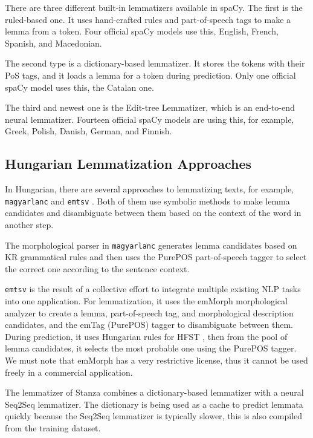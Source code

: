 \documentclass{llncs}
\newcommand{\emtsv}{\texttt{emtsv}}
\newcommand{\magyarlanc}{\texttt{magyarlanc}}
\begin{document}
There are three different built-in lemmatizers available in spaCy. The first is the ruled-based one. It uses hand-crafted rules and part-of-speech tags to make a lemma from a token. Four official spaCy models use this, English, French, Spanish, and Macedonian.

The second type is a dictionary-based lemmatizer. It stores the tokens with their PoS tags, and it loads a lemma for a token during prediction. Only one official spaCy model uses this, the Catalan one.

The third and newest one is the Edit-tree Lemmatizer, which is an end-to-end neural lemmatizer. Fourteen official spaCy models are using this, for example, Greek, Polish, Danish, German, and Finnish.

\subsection{Hungarian Lemmatization Approaches}

In Hungarian, there are several approaches to lemmatizing texts, for example, \magyarlanc{}  \citep{magyaralanc} and \emtsv{} \citep{emtsv1, emtsv2, emtsv3}. Both of them use symbolic methods to make lemma candidates and disambiguate between them based on the context of the word in another step. 

The morphological parser in \magyarlanc{} generates lemma candidates based on KR \citep{tron2006annotation} grammatical rules and then uses the PurePOS part-of-speech tagger \citep{purepos} to select the correct one according to the sentence context.

\emtsv{} is the result of a collective effort to integrate multiple existing NLP tasks into one application. For lemmatization, it uses the emMorph \citep{novak2016new,novak2014new} morphological analyzer to create a lemma, part-of-speech tag, and morphological description candidates, and the emTag (PurePOS) tagger to disambiguate between them. During prediction, it uses Hungarian rules \citep{novak2015model} for HFST \citep{hfst}, then from the pool of lemma candidates, it selects the most probable one using the PurePOS tagger. We must note that emMorph has a very restrictive license, thus it cannot be used freely in a commercial application.

The lemmatizer of Stanza \citep{stanza} combines a dictionary-based lemmatizer with a neural Seq2Seq lemmatizer. The dictionary  is being used as a cache to predict lemmata quickly because the Seq2Seq lemmatizer is typically slower, this is also compiled from the training dataset.
\end{document}
